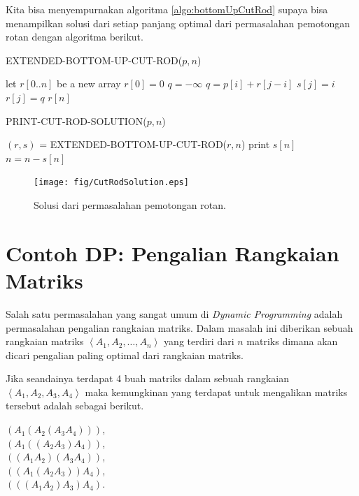 Kita bisa menyempurnakan algoritma \ref{algo:bottomUpCutRod} supaya bisa menampilkan solusi dari setiap panjang optimal dari permasalahan pemotongan rotan dengan algoritma berikut.

\begin{algorithm}
	\caption{EXTENDED-BOTTOM-UP-CUT-ROD($p,n$)}
	\label{algo:extBottomUpCutRod}
	\begin{algorithmic}[1]
		\STATE let $r[0..n]$ be a new array
		\STATE $r[0] = 0$
			\STATE $q=-\infty$
					\STATE $q=p[i]+r[j-i]$
					\STATE $s[j]=i$
				\ENDIF
			\ENDFOR
			\STATE $r[j] = q$
		\ENDFOR
		\RETURN $r[n]$
	\end{algorithmic}
\end{algorithm}

\begin{algorithm}
	\caption{PRINT-CUT-ROD-SOLUTION($p,n$)}
	\label{algo:printCutRodSolution}
	\begin{algorithmic}[1]
		\STATE $(r,s)$ = EXTENDED-BOTTOM-UP-CUT-ROD($r,n$)
			\STATE print $s[n]$
			\STATE $n = n - s[n]$
		\ENDWHILE
	\end{algorithmic}
\end{algorithm}

\begin{figure}
\centering
\texttt{[image: fig/CutRodSolution.eps]}%
\caption{Solusi dari permasalahan pemotongan rotan.}%
\label{fig:cutRodSolution}%
\end{figure}

\section{Contoh DP: Pengalian Rangkaian Matriks}

Salah satu permasalahan yang sangat umum di \textit{Dynamic Programming} adalah permasalahan pengalian rangkaian matriks. Dalam masalah ini diberikan sebuah rangkaian matriks $\left\langle A_{1},A_{2},\ldots,A_{n} \right\rangle$ yang terdiri dari $n$ matriks dimana akan dicari pengalian paling optimal dari rangkaian matriks.  

Jika seandainya terdapat 4 buah matriks dalam sebuah rangkaian $\left\langle A_{1},A_{2},A_{3},A_{4} \right\rangle$ maka kemungkinan yang terdapat untuk mengalikan matriks tersebut adalah sebagai berikut.


$(A_{1}(A_{2}(A_{3}A_{4})))$,\\
$(A_{1}((A_{2}A_{3})A_{4}))$,\\
$((A_{1}A_{2})(A_{3}A_{4}))$,\\
$((A_{1}(A_{2}A_{3}))A_{4})$,\\
$(((A_{1}A_{2})A_{3})A_{4})$.

